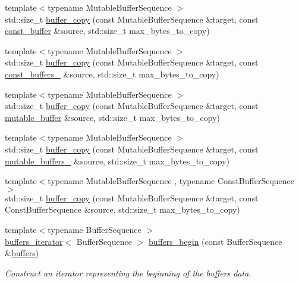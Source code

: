 \begin{DoxyCompactItemize}
{\footnotesize template$<$typename Mutable\+Buffer\+Sequence $>$ }\\std\+::size\+\_\+t \hyperlink{group__buffer__copy_ga8a4ac1b034c7a80d4e5ebbd858a9c727}{buffer\+\_\+copy} (const Mutable\+Buffer\+Sequence \&target, const \hyperlink{classasio_1_1const__buffer}{const\+\_\+buffer} \&source, std\+::size\+\_\+t max\+\_\+bytes\+\_\+to\+\_\+copy)
\item 
{\footnotesize template$<$typename Mutable\+Buffer\+Sequence $>$ }\\std\+::size\+\_\+t \hyperlink{group__buffer__copy_gaa146b63f2bdc20a3c0bd5e4c4d8d0ead}{buffer\+\_\+copy} (const Mutable\+Buffer\+Sequence \&target, const \hyperlink{classasio_1_1const__buffers__1}{const\+\_\+buffers\+\_} \&source, std\+::size\+\_\+t max\+\_\+bytes\+\_\+to\+\_\+copy)
\item 
{\footnotesize template$<$typename Mutable\+Buffer\+Sequence $>$ }\\std\+::size\+\_\+t \hyperlink{group__buffer__copy_ga31d071ecd1fc863feac8d1ca303c4346}{buffer\+\_\+copy} (const Mutable\+Buffer\+Sequence \&target, const \hyperlink{classasio_1_1mutable__buffer}{mutable\+\_\+buffer} \&source, std\+::size\+\_\+t max\+\_\+bytes\+\_\+to\+\_\+copy)
\item 
{\footnotesize template$<$typename Mutable\+Buffer\+Sequence $>$ }\\std\+::size\+\_\+t \hyperlink{group__buffer__copy_ga328a0f81f124d05c142465d3ebeeefeb}{buffer\+\_\+copy} (const Mutable\+Buffer\+Sequence \&target, const \hyperlink{classasio_1_1mutable__buffers__1}{mutable\+\_\+buffers\+\_} \&source, std\+::size\+\_\+t max\+\_\+bytes\+\_\+to\+\_\+copy)
\item 
{\footnotesize template$<$typename Mutable\+Buffer\+Sequence , typename Const\+Buffer\+Sequence $>$ }\\std\+::size\+\_\+t \hyperlink{group__buffer__copy_ga0552327b5c66c5f764476539909d3d15}{buffer\+\_\+copy} (const Mutable\+Buffer\+Sequence \&target, const Const\+Buffer\+Sequence \&source, std\+::size\+\_\+t max\+\_\+bytes\+\_\+to\+\_\+copy)
\item 
{\footnotesize template$<$typename Buffer\+Sequence $>$ }\\\hyperlink{classasio_1_1buffers__iterator}{buffers\+\_\+iterator}$<$ Buffer\+Sequence $>$ \hyperlink{namespaceasio_a9d6099d23e9bf78b2b1ad82d164d3d7e}{buffers\+\_\+begin} (const Buffer\+Sequence \&\hyperlink{group__async__read_ga54dede45c3175148a77fe6635222c47d}{buffers})
\begin{DoxyCompactList}\small\item\em Construct an iterator representing the beginning of the buffers\textquotesingle{} data. \end{DoxyCompactList}\item 

\end{DoxyCompactItemize}
